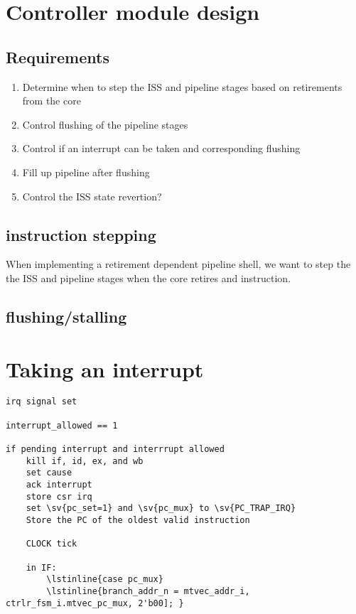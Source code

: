 
\section{Controller module design}

\subsection{Requirements}

\begin{enumerate}
    \item Determine when to step the ISS and pipeline stages based on retirements from the core
    \item Control flushing of the pipeline stages
    \item Control if an interrupt can be taken and corresponding flushing
    \item Fill up pipeline after flushing
    \item Control the ISS state revertion?
\end{enumerate}


\subsection{instruction stepping}

When implementing a retirement dependent pipeline shell, we want to step the the ISS and pipeline stages when the core retires and instruction. 

\textbf{}

\subsection{flushing/stalling}

\section{Taking an interrupt}

\textbf{}

\begin{lstlisting}
irq signal set

interrupt_allowed == 1

if pending interrupt and interrrupt allowed
    kill if, id, ex, and wb
    set cause
    ack interrupt
    store csr irq
    set \sv{pc_set=1} and \sv{pc_mux} to \sv{PC_TRAP_IRQ}
    Store the PC of the oldest valid instruction

    CLOCK tick

    in IF:
        \lstinline{case pc_mux}
        \lstinline{branch_addr_n = mtvec_addr_i, ctrlr_fsm_i.mtvec_pc_mux, 2'b00]; }
        


\end{lstlisting}


